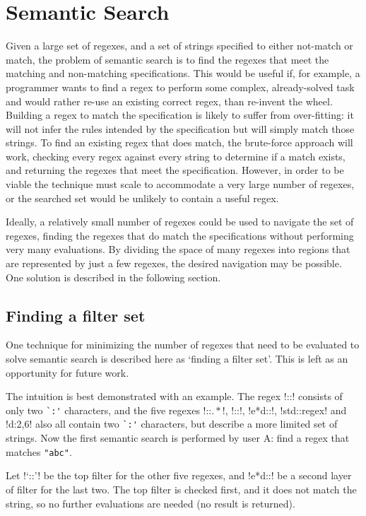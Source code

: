 \section{Semantic Search}
Given a large set of regexes, and a set of strings specified to either not-match or match, the problem of semantic search is to find the regexes that meet the matching and non-matching specifications.  This would be useful if, for example, a programmer wants to find a regex to perform some complex, already-solved task and would rather re-use an existing correct regex, than re-invent the wheel.  Building a regex to match the specification is likely to suffer from over-fitting: it will not infer the rules intended by the specification but will simply match those strings.  To find an existing regex that does match, the brute-force approach will work, checking every regex against every string to determine if a match exists, and returning the regexes that meet the specification.  However, in order to be viable the technique must scale to accommodate a very large number of regexes, or the searched set would be unlikely to contain a useful regex.

Ideally, a relatively small number of regexes could be used to navigate the set of regexes, finding the regexes that do match the specifications without performing very many evaluations.  By dividing the space of many regexes into regions that are represented by just a few regexes, the desired navigation may be possible.  One solution is described in the following section.

\subsection{Finding a filter set} One technique for minimizing the number of regexes that need to be evaluated to solve semantic search is described here as `finding a filter set'.  This is left as an opportunity for future work.

The intuition is best demonstrated with an example.  The regex \cverb!::! consists of only two \verb!`:'! characters, and the five regexes \cverb!::\(.*\)!, \cverb!\s*::\s*!, \cverb!e*d::!, \cverb!std::regex! and \cverb!d:{2,6}! also all contain two \verb!`:'! characters, but describe a more limited set of strings.  Now the first semantic search is performed by user A: find a regex that matches \verb!"abc"!.

Let \cverb!`::'! be the top filter for the other five regexes, and \cverb!e*d::! be a second layer of filter for the last two.  The top filter is checked first, and it does not match the string, so no further evaluations are needed (no result is returned).

